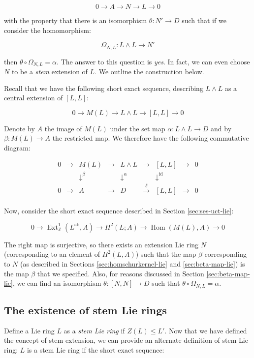 $$0 \to A \to N \to L \to 0$$

with the property that there is an isomorphism $\theta:N' \to D$ such
that if we consider the homomorphism:

$$\Omega_{N,L}: L \wedge L \to N'$$

then $\theta \circ \Omega_{N,L} = \alpha$. The answer to this question is
{\em yes}. In fact, we can even choose $N$ to be a {\em stem}
extension of $L$. We outline the construction below.

Recall that we have the following short exact sequence, describing $L
\wedge L$ as a central extension of $[L,L]$:

$$0 \to M(L) \to L \wedge L \to [L,L] \to 0$$

Denote by $A$ the image of $M(L)$ under the set map $\alpha:L \wedge L
\to D$ and by $\beta:M(L) \to A$ the restricted map. We therefore
have the following commutative diagram:

$$\begin{array}{ccccccccc}
  0 & \to & M(L) & \to & L \wedge L & \to & [L,L] & \to & 0\\
  &&   \downarrow^{\beta}  &&  \downarrow^{\alpha}     && \downarrow^{\text{id}} && \\
  0 & \to & A &\to & D & \stackrel{\delta}{\to} & [L,L] & \to & 0\\
\end{array}$$

Now, consider the short exact sequence described in Section
\ref{sec:ses-uct-lie}:

$$0 \to \operatorname{Ext}^1_{\mathbb{Z}}(L^{\operatorname{ab}},A) \to H^2(L;A) \to \operatorname{Hom}(M(L),A) \to 0$$

The right map is surjective, so there exists an extension Lie ring $N$
(corresponding to an element of $H^2(L,A)$) such that the map $\beta$
corresponding to $N$ (as described in Sections
\ref{sec:homschurkernel-lie} and \ref{sec:beta-map-lie}) is the map $\beta$
that we specified. Also, for reasons discussed in Section
\ref{sec:beta-map-lie}, we can find an isomorphism $\theta:[N,N] \to D$
such that $\theta \circ \Omega_{N,L} = \alpha$.

\subsection{The existence of stem Lie rings}\label{sec:stem-lie-ring-existence}

Define a Lie ring $L$ as a {\em stem Lie ring} if $Z(L) \le L'$. Now
that we have defined the concept of stem extension, we can provide an
alternate definition of stem Lie ring: $L$ is a stem Lie ring if the
short exact sequence:

